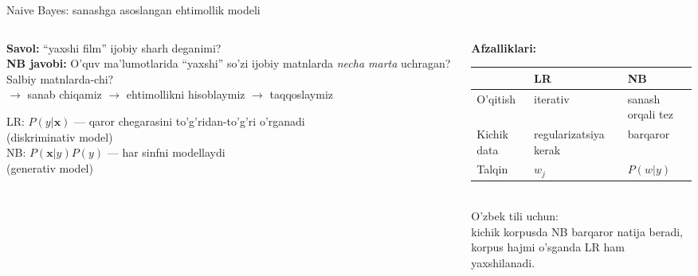 \documentclass[aspectratio=169,11pt]{beamer}
\begin{document}
\begin{frame}{Naive Bayes: sanashga asoslangan ehtimollik modeli}
  \begin{columns}[T]
    \begin{column}{0.50\textwidth}
      \small
      \textbf{Savol:} ``yaxshi film'' ijobiy sharh deganimi?\\[5pt]
      \textbf{NB javobi:} O'quv ma'lumotlarida ``yaxshi'' so'zi
      ijobiy matnlarda \textit{necha marta} uchragan?
      Salbiy matnlarda-chi?\\[5pt]
      $\to$ sanab chiqamiz $\to$ ehtimollikni hisoblaymiz $\to$ taqqoslaymiz\\[5pt]
      \begin{tcolorbox}[defbox,title=NB mantig'i]
        \small
        LR: $P(y|\mathbf{x})$ --- qaror chegarasini to'g'ridan-to'g'ri o'rganadi\\
        (diskriminativ model)\\[3pt]
        NB: $P(\mathbf{x}|y)P(y)$ --- har sinfni modellaydi\\
        (generativ model)
      \end{tcolorbox}
    \end{column}
    \begin{column}{0.46\textwidth}
      \small
      \textbf{Afzalliklari:}\\[4pt]
      \begin{tabular}{@{}lll@{}}
        \toprule
        & LR & NB \\
        \midrule
        O'qitish & iterativ & sanash orqali tez \\
        Kichik data & regularizatsiya kerak & barqaror \\
        Talqin & $w_j$ & $P(w|y)$ \\
        \bottomrule
      \end{tabular}
      \vspace{6pt}\\
      \small\textcolor{halfgray}{
        O'zbek tili uchun:\\
        kichik korpusda NB barqaror natija beradi,\\
        korpus hajmi o'sganda LR ham yaxshilanadi.}
    \end{column}
  \end{columns}
\end{frame}
\end{document}
